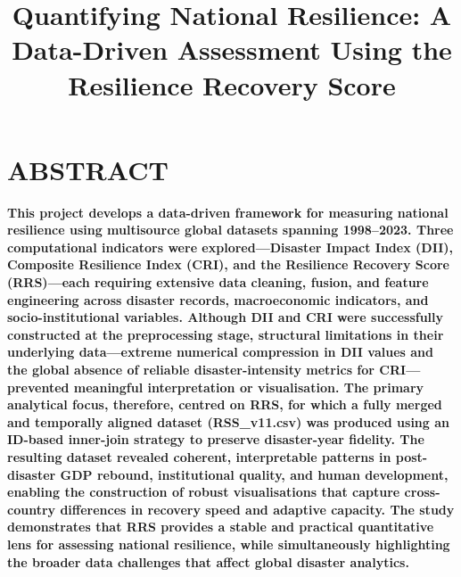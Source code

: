 \documentclass[conference]{IEEEtran}
\begin{document}
\title{Quantifying National Resilience: A Data-Driven Assessment Using the Resilience Recovery Score}

\author{
\and
{}
}
\maketitle

\section*{\textbf{ABSTRACT}}
\textbf{This project develops a data-driven framework for measuring national resilience using multisource global datasets spanning 1998–2023. Three computational indicators were explored—Disaster Impact Index (DII), Composite Resilience Index (CRI), and the Resilience Recovery Score (RRS)—each requiring extensive data cleaning, fusion, and feature engineering across disaster records, macroeconomic indicators, and socio-institutional variables. Although DII and CRI were successfully constructed at the preprocessing stage, structural limitations in their underlying data—extreme numerical compression in DII values and the global absence of reliable disaster-intensity metrics for CRI—prevented meaningful interpretation or visualisation. The primary analytical focus, therefore, centred on RRS, for which a fully merged and temporally aligned dataset (RSS\_v11.csv) was produced using an ID-based inner-join strategy to preserve disaster-year fidelity. The resulting dataset revealed coherent, interpretable patterns in post-disaster GDP rebound, institutional quality, and human development, enabling the construction of robust visualisations that capture cross-country differences in recovery speed and adaptive capacity. The study demonstrates that RRS provides a stable and practical quantitative lens for assessing national resilience, while simultaneously highlighting the broader data challenges that affect global disaster analytics.}
\end{document}
